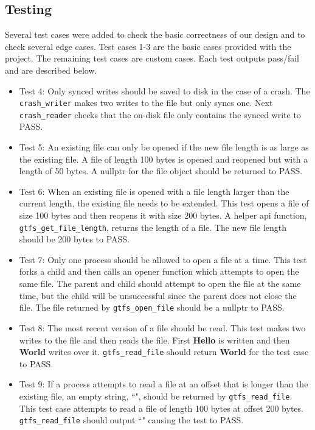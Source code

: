 \documentclass{article}
\begin{document}
\subsection*{Testing}
Several test cases were added to check the basic correctness of our design and to check several edge cases. Test cases 1-3 are the basic cases provided with the project. The remaining test cases are custom cases. Each test outputs pass/fail and are described below.
\begin{itemize}
    \item Test 4: Only synced writes should be saved to disk in the case of a crash. The \texttt{crash\_writer} makes two writes to the file but only syncs one. Next \texttt{crash\_reader} checks that the on-disk file only contains the synced write to PASS.
    \item Test 5: An existing file can only be opened if the new file length is as large as the existing file. A file of length 100 bytes is opened and reopened but with a length of 50 bytes. A nullptr for the file object should be returned to PASS.
    \item Test 6: When an existing file is opened with a file length larger than the current length, the existing file needs to be extended. This test opens a file of size 100 bytes and then reopens it with size 200 bytes. A helper api function, \texttt{gtfs\_get\_file\_length}, returns the length of a file. The new file length should be 200 bytes to PASS.
    \item Test 7: Only one process should be allowed to open a file at a time. This test forks a child and then calls an opener function which attempts to open the same file. The parent and child should attempt to open the file at the same time, but the child will be unsuccessful since the parent does not close the file. The file returned by \texttt{gtfs\_open\_file} should be a nullptr to PASS.
    \item Test 8: The most recent version of a file should be read. This test makes two writes to the file and then reads the file. First \textbf{Hello} is written and then \textbf{World} writes over it. \texttt{gtfs\_read\_file} should return \textbf{World} for the test case to PASS.
    \item Test 9: If a process attempts to read a file at an offset that is longer than the existing file, an empty string, ``", should be returned by \texttt{gtfs\_read\_file}. This test case attempts to read a file of length 100 bytes at offset 200 bytes. \texttt{gtfs\_read\_file} should output ``" causing the test to PASS.
\end{itemize}
\end{document}
